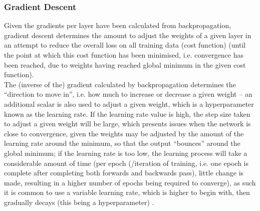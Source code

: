\subsubsection{Gradient Descent}
\label{gradient_descent}
Given the gradients per layer have been calculated from backpropagation, gradient descent determines the amount to adjust the weights of a given layer in an attempt to reduce the overall loss on all training data (cost function) (until the point at which this cost function has been minimised, i.e. convergence has been reached, due to weights having reached global minimum in the given cost function).\\
The (inverse of the) gradient calculated by backpropagation determines the ``direction to move in'', i.e. how much to increase or decrease a given weight -- an additional scalar is also used to adjust a given weight, which is a hyperparameter known as the learning rate. If the learning rate value is high, the step size taken to adjust a given weight will be large, which presents issues when the network is close to convergence, given the weights may be adjusted by the amount of the learning rate around the minimum, so that the output ``bounces'' around the global minimum; if the learning rate is too low, the learning process will take a considerable amount of time (per epoch (/iteration of training, i.e. one epoch is complete after completing both forwards and backwards pass), little change is made, resulting in a higher number of epochs being required to converge), as such it is common to use a variable learning rate, which is higher to begin with, then gradually decays (this being a hyperparameter) \citep{analyticsvidhya:gradient-descent_backpropagation}.







